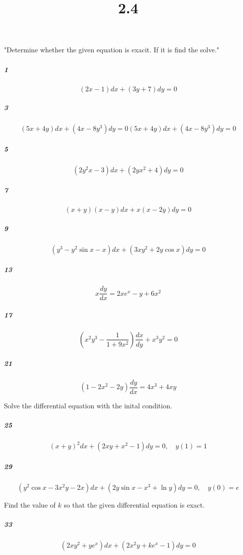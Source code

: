 \documentclass[fleqn]{article}
\title{2.4}
\begin{document}
\maketitle
\pagebreak
 "Determine whether the given equation is exacit. If it is find the  solve."

\subparagraph{1}

\[
(2x - 1)dx + (3y + 7)dy = 0
\]
\vfill



\subparagraph{3}

\[
(5x + 4y)dx + (4x - 8y^3)dy = 0(5x + 4y)dx + (4x - 8y^3)dy = 0
\]
\vfill


\pagebreak


\subparagraph{5}

\[
(2y^2x - 3)dx + (2yx^2 + 4)dy = 0
\]
\vfill



\subparagraph{7}

\[
(x + y)(x - y)dx + x(x - 2y)dy = 0
\]
\vfill


\pagebreak


\subparagraph{9}

\[
(y^3 - y^2 \sin x - x)dx + (3xy^2 + 2y \cos x)dy = 0
\]
\vfill



\subparagraph{13}

\[
x\frac{dy}{dx} = 2xe^x - y + 6x^2
\]
\vfill


\pagebreak


\subparagraph{17}

\[
\left(x^2y^3 - \frac{1}{1 + 9x^2}\right)\frac{dx}{dy} + x^3y^2 = 0
\]
\vfill



\subparagraph{21}

\[
(1 - 2x^2 - 2y) \frac{dy}{dx} = 4x^3 + 4xy
\]
\vfill


\pagebreak
 Solve the differential equation with the inital condition.

\subparagraph{25}

\[
(x + y)^{2} dx + (2xy + x^{2} - 1)dy = 0, \quad y(1) = 1
\]
\vfill



\subparagraph{29}

\[
(y^{2} \cos x - 3x^{2}y - 2x)dx + (2y \sin x - x^{3} + \ln y)dy = 0, \quad y(0) = e
\]
\vfill


\pagebreak
 Find the value of $k$ so that the given differential equation is exact.

\subparagraph{33}

\[
(2xy^{2} + ye^{x})dx + (2x^{2}y + ke^{x} - 1)dy = 0
\]
\vfill
\end{document}
